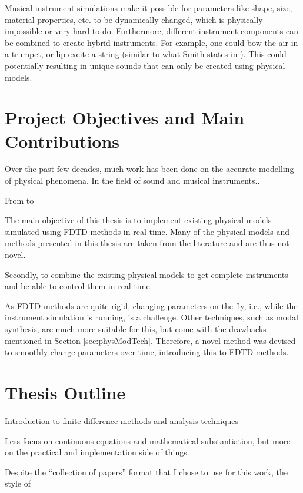 Musical instrument simulations make it possible for parameters like shape, size, material properties, etc. to be dynamically changed, which is physically impossible or very hard to do. Furthermore, different instrument components can be combined to create hybrid instruments. For example, one could bow the air in a trumpet, or lip-excite a string (similar to what Smith states in \cite{Smith2010a}). This could potentially resulting in unique sounds that can only be created using physical models.

\section{Project Objectives and Main Contributions}
Over the past few decades, much work has been done on the accurate modelling of physical phenomena. In the field of sound and musical instruments.. 

From \cite{Fletcher1998} to \cite{Bilbao2019CMJb}



The main objective of this thesis is to implement existing physical models simulated using FDTD methods in real time. Many of the physical models and methods presented in this thesis are taken from the literature and are thus not novel. 

Secondly, to combine the existing physical models to get complete instruments and be able to control them in real time.

As FDTD methods are quite rigid, changing parameters on the fly, i.e., while the instrument simulation is running, is a challenge.  Other techniques, such as modal synthesis, are much more suitable for this, but come with the drawbacks mentioned in Section \ref{sec:physModTech}. Therefore, a novel method was devised to smoothly change parameters over time, introducing this to FDTD methods. 


\section{Thesis Outline}

Introduction to finite-difference methods and analysis techniques

Less focus on continuous equations and mathematical substantiation, but more on the practical and implementation side of things.

Despite the ``collection of papers'' format that I chose to use for this work, the style of  





